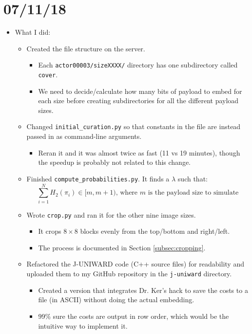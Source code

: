 \documentclass[11pt,a4paper]{report}
\begin{document}
\begin{itemize}
\end{itemize}


\section{07/11/18}

\begin{itemize}

\item What I did:
  \begin{itemize}
  \item Created the file structure on the server.
    \begin{itemize}
    \item Each \texttt{actor00003/sizeXXXX/} directory has one subdirectory called \texttt{cover}.
    \item We need to decide/calculate how many bits of payload to embed for each size before creating subdirectories for all the different payload sizes.
    \end{itemize}

  \item Changed \texttt{initial\_curation.py} so that constants in the file are instead passed in as command-line arguments.
    \begin{itemize}
    \item Reran it and it was almost twice as fast (11 vs 19 minutes), though the speedup is probably not related to this change.
    \end{itemize}

  \item Finished \texttt{compute\_probabilities.py}. It finds a $\lambda$ such that:
    \begin{equation*}
    \sum\limits_{i=1}^N H_2(\pi_i) \in [m, m+1)\text{, where $m$ is the payload size to simulate}
    \end{equation*}

  \item Wrote \texttt{crop.py} and ran it for the other nine image sizes.
    \begin{itemize}
    \item It crops $8\times8$ blocks evenly from the top/bottom and right/left.
    \item The process is documented in Section \ref{subsec:cropping}.
    \end{itemize}

  \item Refactored the J-UNIWARD code (C++ source files) for readability and uploaded them to my GitHub repository in the \texttt{j-uniward} directory.
    \begin{itemize}
    \item Created a version that integrates Dr. Ker's hack to save the costs to a file (in ASCII) without doing the actual embedding.
    \item 99\% sure the costs are output in row order, which would be the intuitive way to implement it.
  \end{itemize}


\end{itemize}
\end{itemize}
\end{document}
